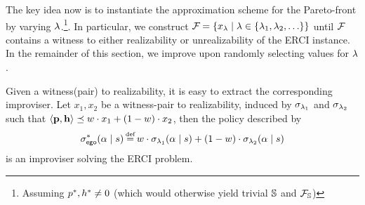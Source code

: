 {The key idea now is to instantiate the approximation scheme for the Pareto-front by varying $\lambda$.\footnote{Assuming $p^{*}, h^{*} \neq 0$ (which would
otherwise yield trivial $\mathbb{S}$ and $\mathcal{F}_{\mathbb{S}}$)}.
In particular, we construct $\mathcal{F}_{} = \{ x_\lambda \mid \lambda \in \{ \lambda_1, \lambda_2, \hdots \} \}$ until $\mathcal{F}_{}$ contains a witness to either realizability or unrealizability of the ERCI instance. 
In the remainder of this section, we improve upon randomly selecting values for $\lambda$.

\begin{remark}
Given a witness(pair) to realizability, it is easy to extract the corresponding improviser. Let $x_1,x_2$ be a witness-pair to realizability,  induced by $\sigma_{\lambda_1}$ and $\sigma_{\lambda_2}$ such that $\langle\mathbf{p}, \mathbf{h}\rangle\preceq w\cdot x_1 + (1-w)\cdot x_2$, then the policy described by  	
\begin{equation}\label{eq:4}
  \sigma^*_\pOne(\act \mid s) \eqdef w\cdot \sched_{\rat_1}(\act \mid s) + (1-w) \cdot \sched_{\rat_2}(\act  \mid s)
\end{equation}
is an improviser solving the ERCI problem.
\end{remark}



%

}
